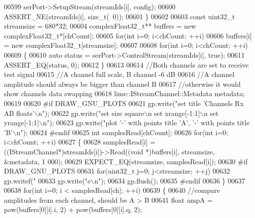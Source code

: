 \begin{DoxyCode}
{{{{{{00599         serPort->SetupStream(streamIds[i], config);
00600         ASSERT\_NE(streamIds[i], \textcolor{keywordtype}{size\_t}(~0));
00601     \}
00602 
00603     \textcolor{keyword}{const} uint32\_t streamsize = 680*32;
00604     complexFloat32_t** buffers = \textcolor{keyword}{new} complexFloat32_t*[chCount];
00605     \textcolor{keywordflow}{for}(\textcolor{keywordtype}{int} i=0; i<chCount; ++i)
00606         buffers[i] = \textcolor{keyword}{new} complexFloat32_t[streamsize];
00607 
00608     \textcolor{keywordflow}{for}(\textcolor{keywordtype}{int} i=0; i<chCount; ++i)
00609     \{
00610         \textcolor{keyword}{auto} status = serPort->ControlStream(streamIds[i], \textcolor{keyword}{true});
00611         ASSERT\_EQ(status, 0);
00612     \}
00613 
00614     \textcolor{comment}{//Both channels are set to receive test signal}
00615     \textcolor{comment}{//A channel full scale, B channel -6 dB}
00616     \textcolor{comment}{//A channel amplitude should always be bigger than channel B}
00617     \textcolor{comment}{//otherwise it would show channels data swapping}
00618     lime::IStreamChannel::Metadata metadata;
00619 
00620 \textcolor{preprocessor}{#if DRAW\_GNU\_PLOTS}
00621     gp.write(\textcolor{stringliteral}{"set title 'Channels Rx AB floats'\(\backslash\)n"});
00622     gp.write(\textcolor{stringliteral}{"set size square\(\backslash\)n set xrange[-1:1]\(\backslash\)n set yrange[-1:1]\(\backslash\)n"});
00623     gp.write(\textcolor{stringliteral}{"plot '-' with points title 'A', '-' with points title 'B'\(\backslash\)n"});
00624 \textcolor{preprocessor}{#endif}
00625     \textcolor{keywordtype}{int} samplesRead[chCount];
00626     \textcolor{keywordflow}{for}(\textcolor{keywordtype}{int} i=0; i<chCount; ++i)
00627     \{
00628         samplesRead[i] = ((IStreamChannel*)streamIds[i])->Read((\textcolor{keywordtype}{void} *)buffers[i], streamsize, &metadata, 1
      000);
00629         EXPECT\_EQ(streamsize, samplesRead[i]);
00630 \textcolor{preprocessor}{#if DRAW\_GNU\_PLOTS}
00631         \textcolor{keywordflow}{for}(uint32\_t j=0; j<streamsize; ++j)
00632             gp.writef(\textcolor{stringliteral}{"%
00633         gp.write(\textcolor{stringliteral}{"e\(\backslash\)n"});
00634         gp.flush();
00635 \textcolor{preprocessor}{#endif}
00636     \}
00637 
00638     \textcolor{keywordflow}{for}(\textcolor{keywordtype}{int} i=0; i < samplesRead[ch]; ++i)
00639     \{
00640         \textcolor{comment}{//compare amplitudes from each channel, should be A > B}
00641         \textcolor{keywordtype}{float} ampA = pow(buffers[0][i].i, 2) + pow(buffers[0][i].q, 2);
}}}}}}}
\end{DoxyCode}
